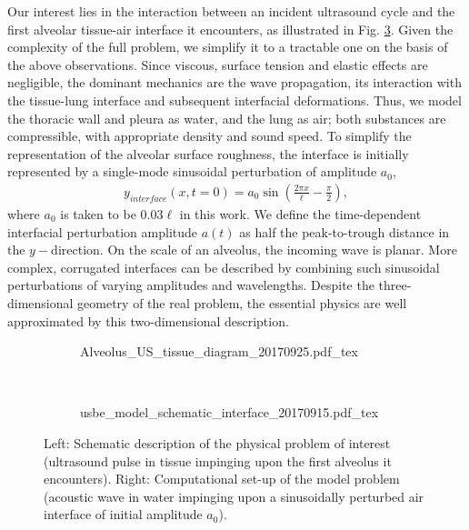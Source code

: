 \documentclass{jfm}%
\begin{document}
Our interest lies in the interaction between an incident ultrasound
cycle and the first alveolar tissue-air interface it encounters, as
illustrated in Fig. \ref{fig:schematics}.  Given the complexity of
the full problem, we simplify it to a tractable one on the basis of
the above observations. Since viscous, surface tension and elastic
effects are negligible, the dominant mechanics are the wave
propagation, its interaction with the tissue-lung interface and
subsequent interfacial deformations. Thus, we model the thoracic wall
and pleura as water, and the lung as air; both substances are
compressible, with appropriate density and sound speed.  To simplify
the representation of the alveolar surface roughness, the interface is
initially represented by a single-mode sinusoidal perturbation of
amplitude $a_0$,
\begin{align}
  y_{interface}(x,t=0) = a_0\sin\left(\frac{2\pi x}{\ell}-\frac{\pi}{2}\right),
\end{align}
where $a_0$ is taken to be $0.03\ell$ in this work.  We define the time-dependent
interfacial perturbation amplitude $a(t)$ as half the peak-to-trough
distance in the $y-$direction. On the scale of an alveolus, the
incoming wave is planar.  More complex, corrugated interfaces can be
described by combining such sinusoidal perturbations of varying
amplitudes and wavelengths.  Despite the three-dimensional geometry of
the real problem, the essential physics are well approximated
by this two-dimensional description.
% 
\begin{figure}
  \centering
  \begin{subfigure}[b]{0.48\textwidth}
    \centering
    \def\svgwidth{\textwidth}
    {Alveolus_US_tissue_diagram_20170925.pdf_tex} \hfill%
    \label{fig:alveolar_schematic}%
  \end{subfigure}
  ~
  \begin{subfigure}[b]{0.48\textwidth}
    \centering
    \def\svgwidth{\textwidth}
    {usbe_model_schematic_interface_20170915.pdf_tex} \hfill%
    \label{fig:problem_schematic}%
  \end{subfigure}
  \caption[Schematic view of the physical and model problems]{Left:
    Schematic description of the physical problem of interest
    (ultrasound pulse in tissue impinging upon the first alveolus it
    encounters). Right: Computational set-up of the model problem
    (acoustic wave in water impinging upon a sinusoidally perturbed
    air interface of initial amplitude $a_0$).}
  \label{fig:schematics}
\end{figure}
% 
\end{document}
